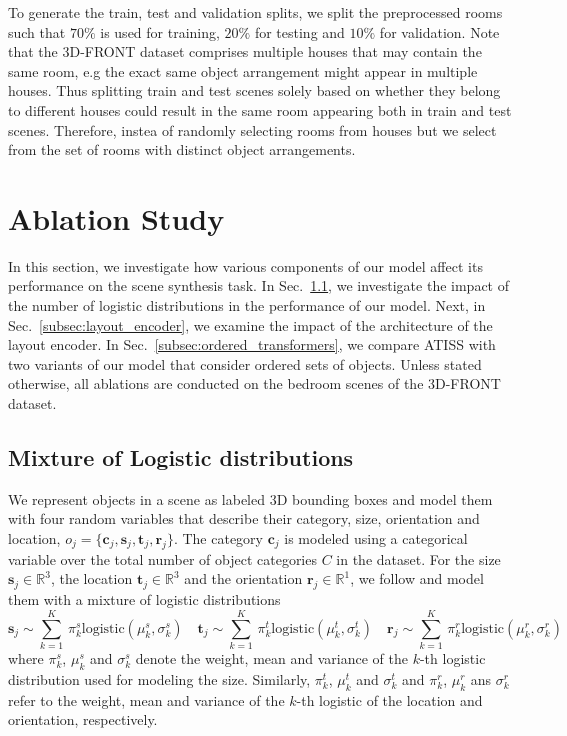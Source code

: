 \documentclass{article}
\newcommand{\bc}{\mathbf{c}}\newcommand{\bC}{\mathbf{C}}
\newcommand{\br}{\mathbf{r}}\newcommand{\bR}{\mathbf{R}}
\newcommand{\bs}{\mathbf{s}}\newcommand{\bS}{\mathbf{S}}
\newcommand{\bt}{\mathbf{t}}\newcommand{\bT}{\mathbf{T}}
\newcommand{\secref}[1]{Sec.~\ref{#1}}
\begin{document}
To generate the train, test and validation splits, we split the preprocessed
rooms such that $70\%$ is used for training, $20\%$ for testing and $10\%$ for
validation. Note that the 3D-FRONT dataset comprises multiple houses that may
contain the same room, e.g the exact same object arrangement might appear in
multiple houses. Thus splitting train and test scenes solely based on whether
they belong to different houses could result in the same room appearing both in
train and test scenes. Therefore, instea of randomly selecting rooms from
houses but we select from the set of rooms with distinct object arrangements.

\section{Ablation Study}
\label{sec:ablations}

In this section, we investigate how various components of our model affect its
performance on the scene synthesis task. In
\secref{subsec:mixture_of_logistic_distributions}, we investigate the impact of
the number of logistic distributions in the performance of our model. 
Next, in
\secref{subsec:layout_encoder}, we examine the impact of the architecture of
the layout encoder. In \secref{subsec:ordered_transformers}, we compare
ATISS with two variants of our model that consider ordered sets of objects.
Unless stated otherwise, all ablations are conducted on the bedroom scenes of
the 3D-FRONT~\cite{Fu2020ARXIVa} dataset.

\subsection{Mixture of Logistic distributions}
\label{subsec:mixture_of_logistic_distributions}

We represent objects in a scene as labeled 3D bounding boxes and model them
with four random variables that describe their category, size, orientation and
location, $o_j = \{\bc_j, \bs_j, \bt_j, \br_j\}$. The category
$\bc_j$ is modeled using a categorical variable over the total number of
object categories $C$ in the dataset. For the size $\bs_j \in \mathbb{R}^3$, the
location $\bt_j \in \mathbb{R}^3$ and the orientation $\br_j \in \mathbb{R}^1$,
we follow \cite{Salimans2017ICLR, Oord2016SSW} and model them with a mixture
of logistic distributions
\begin{equation}
    \bs_j \sim \sum_{k=1}^K \, \pi_k^s \text{logistic}(\mu_k^s, \sigma_k^s)\quad
    \bt_j \sim \sum_{k=1}^K \, \pi_k^t \text{logistic}(\mu_k^t, \sigma_k^t)\quad
    \br_j \sim \sum_{k=1}^K \, \pi_k^r \text{logistic}(\mu_k^r, \sigma_k^r)
\end{equation}
where $\pi_k^s$, $\mu_k^s$ and $\sigma_k^s$ denote the
weight, mean and variance of the $k$-th logistic distribution used for
modeling the size. Similarly, $\pi_k^t$, $\mu_k^t$ and $\sigma_k^t$ and
$\pi_k^r$, $\mu_k^r$ ans $\sigma_k^r$ refer to the weight, mean and variance of
the $k$-th logistic of the location and orientation, respectively.
\end{document}
